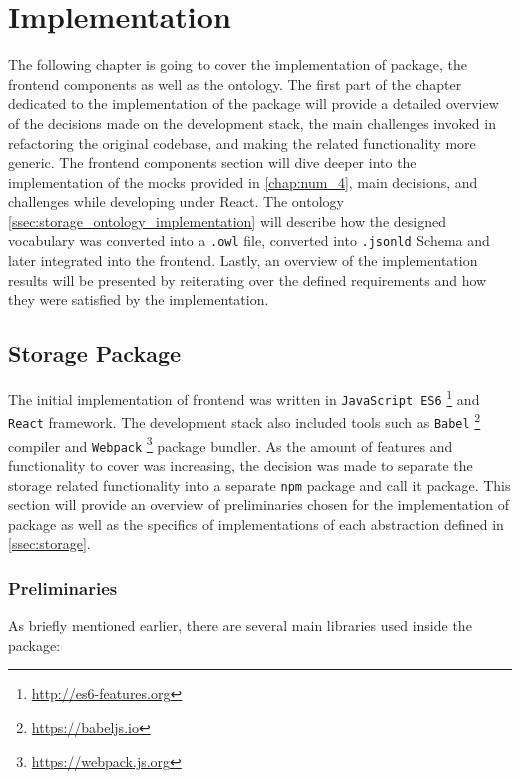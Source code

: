 \chapter{Implementation}
\label{chap:num_5}

The following chapter is going to cover the implementation of \lpas{} package, the frontend components as well as the ontology. The first part of the chapter dedicated to the implementation of the package will provide a detailed overview of the decisions made on the development stack, the main challenges invoked in refactoring the original \lpa{} codebase, and making the \solid{} related functionality more generic. The frontend components section will dive deeper into the implementation of the mocks provided in \autoref{chap:num_4}, main decisions, and challenges while developing under React. The ontology \autoref{ssec:storage_ontology_implementation} will describe how the designed \lpas{} vocabulary was converted into a \texttt{.owl} file, converted into \texttt{.jsonld} Schema and later integrated into the \lpa{} frontend. Lastly, an overview of the implementation results will be presented by reiterating over the defined \lpa{} requirements and how they were satisfied by the implementation.
 
\section{Storage Package}

The initial implementation of \lpa{} frontend was written in \texttt{JavaScript ES6} \footnote{\url{http://es6-features.org}} and \texttt{React} framework. The development stack also included tools such as \texttt{Babel} \footnote{\url{https://babeljs.io}} compiler and \texttt{Webpack} \footnote{\url{https://webpack.js.org}} package bundler. As the amount of features and functionality to cover was increasing, the decision was made to separate the \solid{} storage related functionality into a separate \texttt{npm} package and call it \lpas{} package. This section will provide an overview of preliminaries chosen for the implementation of \lpas{} package as well as the specifics of implementations of each abstraction defined in \autoref{ssec:storage}. 

\subsection{Preliminaries}

As briefly mentioned earlier, there are several main libraries used inside the \lpas{} package:

